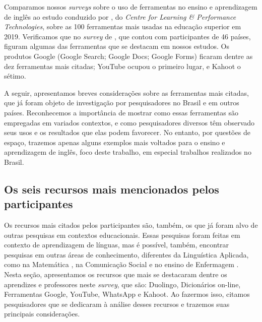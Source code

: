 \documentclass[portuguese]{textolivre}
\begin{document}
Comparamos nossos \textit{surveys} sobre o uso de ferramentas no ensino e aprendizagem de inglês ao estudo conduzido por \textcite{hart_edu100:_nodate}, do \textit{Centre for Learning \& Performance Technologies}, sobre as 100 ferramentas mais usadas na educação superior em 2019. Verificamos que no \textit{survey} de \textcite{hart_edu100:_nodate}, que contou com participantes de 46 países, figuram algumas das ferramentas que se destacam em nossos estudos. Os produtos Google (Google Search; Google Docs; Google Forms) ficaram dentre as dez ferramentas mais citadas; YouTube ocupou o primeiro lugar, e Kahoot o sétimo.

A seguir, apresentamos breves considerações sobre as ferramentas mais citadas, que já foram objeto de investigação por pesquisadores no Brasil e em outros países. Reconhecemos a importância de mostrar como essas ferramentas são empregadas em variados contextos, e como pesquisadores diversos têm observado seus usos e os resultados que elas podem favorecer. No entanto, por questões de espaço, trazemos apenas alguns exemplos mais voltados para o ensino e aprendizagem de inglês, foco deste trabalho, em especial trabalhos realizados no Brasil.

\subsection{Os seis recursos mais mencionados pelos participantes}\label{sec-modelo}
Os recursos mais citados pelos participantes são, também, os que já foram alvo de outras pesquisas em contextos educacionais. Essas pesquisas foram feitas em contexto de aprendizagem de línguas, mas é possível, também, encontrar pesquisas em outras áreas de conhecimento, diferentes da Linguística Aplicada, como na Matemática \cite{romio_kahoot_2017}, na Comunicação Social \cite{anita_baptista_circulacao_2019} e no ensino de Enfermagem \cite{pereira_critical_2016}. Nesta seção, apresentamos os recursos que mais se destacaram dentre os aprendizes e professores neste \textit{survey}, que são: Duolingo, Dicionários on-line, Ferramentas Google, YouTube, WhatsApp e Kahoot.  Ao fazermos isso, citamos pesquisadores que se dedicaram à análise desses recursos e trazemos suas principais considerações.
\end{document}
